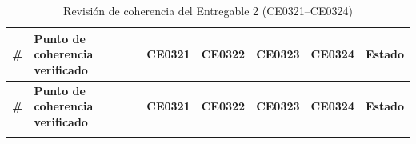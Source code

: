 \documentclass[11pt, a4paper, oneside]{report}
\begin{document}
\begin{landscape}
\thispagestyle{fancy}

\renewcommand{\arraystretch}{1.3}
\footnotesize
{}

\begin{xltabular}{\linewidth}{@{}|L{0.9cm}|L{4.6cm}|L{1.8cm}|L{1.8cm}|L{1.8cm}|L{1.8cm}|L{1.8cm}|@{}}
\caption{Revisión de coherencia del Entregable 2 (CE0321--CE0324)}
\label{tab:coherencia_entregable2} \\

\parbox[c][1.2cm][c]{\linewidth}{\centering\color{white}\bfseries\small \#} &
\parbox[c][1.2cm][c]{\linewidth}{\centering\color{white}\bfseries\small Punto de coherencia verificado} &
\parbox[c][1.2cm][c]{\linewidth}{\centering\color{white}\bfseries\small CE0321} &
\parbox[c][1.2cm][c]{\linewidth}{\centering\color{white}\bfseries\small CE0322} &
\parbox[c][1.2cm][c]{\linewidth}{\centering\color{white}\bfseries\small CE0323} &
\parbox[c][1.2cm][c]{\linewidth}{\centering\color{white}\bfseries\small CE0324} &
\parbox[c][1.2cm][c]{\linewidth}{\centering\color{white}\bfseries\small Estado} \\ \hline
\endfirsthead

\parbox[c][1.2cm][c]{\linewidth}{\centering\color{white}\bfseries\small \#} &
\parbox[c][1.2cm][c]{\linewidth}{\centering\color{white}\bfseries\small Punto de coherencia verificado} &
\parbox[c][1.2cm][c]{\linewidth}{\centering\color{white}\bfseries\small CE0321} &
\parbox[c][1.2cm][c]{\linewidth}{\centering\color{white}\bfseries\small CE0322} &
\parbox[c][1.2cm][c]{\linewidth}{\centering\color{white}\bfseries\small CE0323} &
\parbox[c][1.2cm][c]{\linewidth}{\centering\color{white}\bfseries\small CE0324} &
\parbox[c][1.2cm][c]{\linewidth}{\centering\color{white}\bfseries\small Estado} \\ \hline
\endhead

\hline
\endfoot


\end{xltabular}
\end{landscape}
\end{document}
